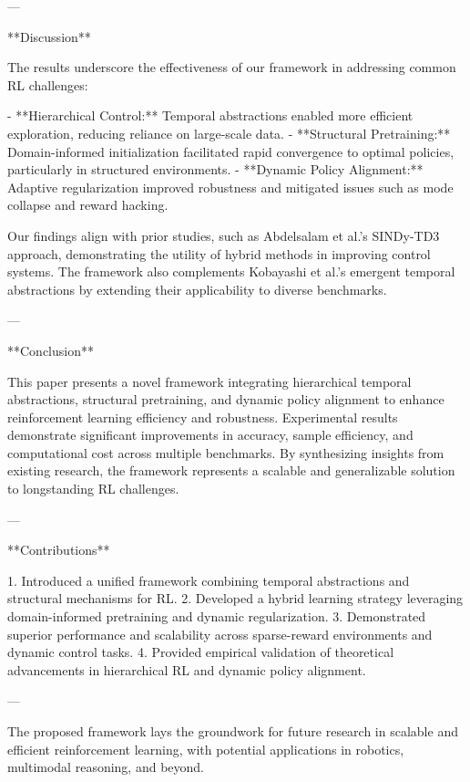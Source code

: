 ---

**Discussion**

The results underscore the effectiveness of our framework in addressing common RL challenges:

- **Hierarchical Control:** Temporal abstractions enabled more efficient exploration, reducing reliance on large-scale data.
- **Structural Pretraining:** Domain-informed initialization facilitated rapid convergence to optimal policies, particularly in structured environments.
- **Dynamic Policy Alignment:** Adaptive regularization improved robustness and mitigated issues such as mode collapse and reward hacking.

Our findings align with prior studies, such as Abdelsalam et al.’s SINDy-TD3 approach, demonstrating the utility of hybrid methods in improving control systems. The framework also complements Kobayashi et al.’s emergent temporal abstractions by extending their applicability to diverse benchmarks.

---

**Conclusion**

This paper presents a novel framework integrating hierarchical temporal abstractions, structural pretraining, and dynamic policy alignment to enhance reinforcement learning efficiency and robustness. Experimental results demonstrate significant improvements in accuracy, sample efficiency, and computational cost across multiple benchmarks. By synthesizing insights from existing research, the framework represents a scalable and generalizable solution to longstanding RL challenges.

---

**Contributions**

1. Introduced a unified framework combining temporal abstractions and structural mechanisms for RL.
2. Developed a hybrid learning strategy leveraging domain-informed pretraining and dynamic regularization.
3. Demonstrated superior performance and scalability across sparse-reward environments and dynamic control tasks.
4. Provided empirical validation of theoretical advancements in hierarchical RL and dynamic policy alignment.

--- 

The proposed framework lays the groundwork for future research in scalable and efficient reinforcement learning, with potential applications in robotics, multimodal reasoning, and beyond.